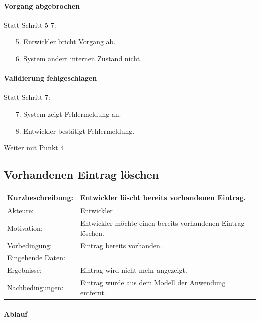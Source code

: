 \paragraph{Vorgang abgebrochen}
Statt Schritt 5-7:
\begin{itemize}[itemsep=0pt]
\item[5.] Entwickler bricht Vorgang ab. 
\item[6.] System ändert internen Zustand nicht. 
\end{itemize}

\paragraph{Validierung fehlgeschlagen}
Statt Schritt 7:
\begin{itemize}[itemsep=0pt]
\item[7.] System zeigt Fehlermeldung an. 
\item[8.] Entwickler bestätigt Fehlermeldung. 
\end{itemize}
Weiter mit Punkt 4. 

\subsection{Vorhandenen Eintrag löschen}
\label{sec:delete_entry}

\begin{tabular}[h]{|p{4cm}|p{}|}
\hline 
\rule[-1ex]{0pt}{2.5ex}Kurzbeschreibung: & 
Entwickler löscht bereits vorhandenen Eintrag. \\  
\hline 
\rule[-1ex]{0pt}{2.5ex}Akteure: & 
Entwickler \\ 
\hline 
\rule[-1ex]{0pt}{2.5ex}Motivation: & 
Entwickler möchte einen bereits vorhandenen Eintrag löschen. \\ 
\hline 
\rule[-1ex]{0pt}{2.5ex}Vorbedingung: & 
Eintrag bereits vorhanden. \\ 
\hline 
\rule[-1ex]{0pt}{2.5ex}Eingehende Daten: & \\ 
\hline 
\rule[-1ex]{0pt}{2.5ex}Ergebnisse: & Eintrag wird nicht mehr angezeigt. \\ 
\hline 
\rule[-1ex]{0pt}{2.5ex}Nachbedingungen: & Eintrag wurde aus dem Modell der Anwendung entfernt.  \\ 
\hline 
\end{tabular} 

\paragraph{Ablauf}

